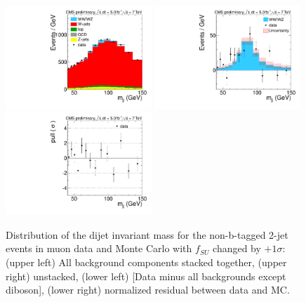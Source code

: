 \begin{figure}[h!]
  {\centering
    \includegraphics[width=0.49\textwidth]{figs/ScaleAndMatchingCrossChecks/mu2JNoBTag_fSUp1sigmafMUDef/Wjj_Diboson_Muon_2jets_Stacked.pdf}
    \includegraphics[width=0.49\textwidth]{figs/ScaleAndMatchingCrossChecks/mu2JNoBTag_fSUp1sigmafMUDef/Wjj_Diboson_Muon_2jets_Subtracted.pdf}
    \includegraphics[width=0.49\textwidth]{figs/ScaleAndMatchingCrossChecks/mu2JNoBTag_fSUp1sigmafMUDef/Wjj_Diboson_Muon_2jets_Pull.pdf}
    \caption{Distribution of the dijet invariant mass for the non-b-tagged 2-jet events in muon data and Monte Carlo with $f_{SU}$ changed by $+1\sigma$: 
      (upper left) All background components stacked together, 
      (upper right) unstacked, (lower left) [Data minus all backgrounds except diboson],  
      (lower right) normalized residual between data and MC. }
    \label{fig:fsufmuXcheck_fSUp1sigmafMUDef}}
\end{figure}
